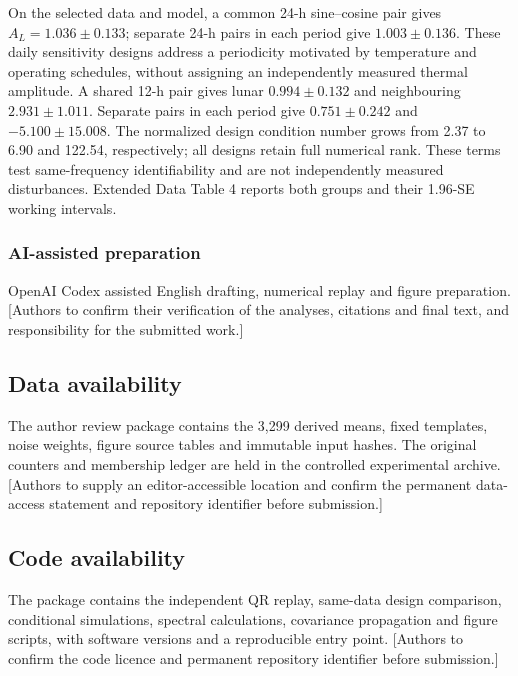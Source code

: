 \documentclass[
  12pt,
  a4paper,
]{article}
\begin{document}
On the selected data and model, a common 24-h sine--cosine pair gives
\(A_L=1.036\pm0.133\); separate 24-h pairs in each period give
\(1.003\pm0.136\). These daily sensitivity designs address a periodicity
motivated by temperature and operating schedules, without assigning an
independently measured thermal amplitude. A shared 12-h pair gives lunar
\(0.994\pm0.132\) and neighbouring \(2.931\pm1.011\). Separate pairs in
each period give \(0.751\pm0.242\) and \(-5.100\pm15.008\). The
normalized design condition number grows from 2.37 to 6.90 and 122.54,
respectively; all designs retain full numerical rank. These terms test
same-frequency identifiability and are not independently measured
disturbances. Extended Data Table 4 reports both groups and their
1.96-SE working intervals.

\hypertarget{ai-assisted-preparation}{%
\subsubsection{AI-assisted preparation}\label{ai-assisted-preparation}}

OpenAI Codex assisted English drafting, numerical replay and figure
preparation. {[}Authors to confirm their verification of the analyses,
citations and final text, and responsibility for the submitted work.{]}

\singlespacing\fontsize{11}{13}\selectfont

\hypertarget{data-availability}{%
\subsection{Data availability}\label{data-availability}}

The author review package contains the 3,299 derived means, fixed
templates, noise weights, figure source tables and immutable input
hashes. The original counters and membership ledger are held in the
controlled experimental archive. {[}Authors to supply an
editor-accessible location and confirm the permanent data-access
statement and repository identifier before submission.{]}

\singlespacing\fontsize{11}{13}\selectfont

\hypertarget{code-availability}{%
\subsection{Code availability}\label{code-availability}}

The package contains the independent QR replay, same-data design
comparison, conditional simulations, spectral calculations, covariance
propagation and figure scripts, with software versions and a
reproducible entry point. {[}Authors to confirm the code licence and
permanent repository identifier before submission.{]}
\end{document}
